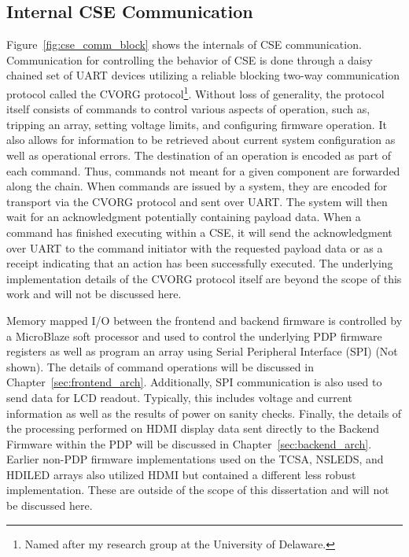     \subsection{Internal CSE Communication}
        Figure~\ref{fig:cse_comm_block} shows the internals of CSE communication. Communication for controlling the behavior of CSE is done through a daisy chained set of UART devices utilizing a reliable blocking two-way communication protocol called the CVORG protocol\footnote{Named after my research group at the University of Delaware.}. Without loss of generality, the protocol itself consists of commands to control various aspects of operation, such as, tripping an array, setting voltage limits, and configuring firmware operation. It also allows for information to be retrieved about current system configuration as well as operational errors. The destination of an operation is encoded as part of each command. Thus, commands not meant for a given component are forwarded along the chain. When commands are issued by a system, they are encoded for transport via the CVORG protocol and sent over UART. The system will then wait for an acknowledgment potentially containing payload data. When a command has finished executing within a CSE, it will send the acknowledgment over UART to the command initiator with the requested payload data or as a receipt indicating that an action has been successfully executed. The underlying implementation details of the CVORG protocol itself are beyond the scope of this work and will not be discussed here.

        Memory mapped I/O between the frontend and backend firmware is controlled by a MicroBlaze soft processor and used to control the underlying PDP firmware registers as well as program an array using Serial Peripheral Interface (SPI) (Not shown). The details of command operations will be discussed in Chapter~\ref{sec:frontend_arch}. Additionally, SPI communication is also used to send data for LCD readout. Typically, this includes voltage and current information as well as the results of power on sanity checks. Finally, the details of the processing performed on HDMI display data sent directly to the Backend Firmware within the PDP will be discussed in Chapter~\ref{sec:backend_arch}. Earlier non-PDP firmware implementations used on the TCSA, NSLEDS, and HDILED arrays also utilized HDMI but contained a different less robust implementation. These are outside of the scope of this dissertation and will not be discussed here.

